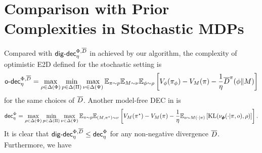 




\section{Comparison with Prior Complexities in Stochastic MDPs}\label{sec: compare DEC} 
Compared with $\mathsf{dig}\text{-}\mathsf{dec}_\eta^{\Phi, \overline{D}}$ in  achieved by our algorithm, the complexity of optimistic E2D  \citep{foster2024model} defined for the stochastic setting is
\begin{align}
    \mathsf{o}\text{-}\mathsf{dec}_\eta^{\Phi, \overline{D}} = \max_{\rho\in\Delta(\Phi)} \min_{p\in\Delta(\Pi)} \max_{\nu\in \Delta(\Psi)} \mathbb{E}_{\pi\sim p}\mathbb{E}_{M\sim \nu}\mathbb{E}_{\phi \sim \rho}\left[ V_\phi(\pi_\phi) - V_M(\pi) - \frac{1}{\eta} \overline{D}^\pi(\phi\|M)\right] \label{eq: odec high level}  
\end{align}
for the same choices of $\overline{D}$. 
Another model-free DEC in \cite{liu2025decision} is 
\begin{align*}
    \mathsf{dec}_\eta^\Phi = \max_{\rho\in\Delta(\Phi)} \min_{p\in\Delta(\Pi)} \max_{\nu\in \Delta(\Psi)}  \mathbb{E}_{\pi\sim p}\mathbb{E}_{(M,\pi^\star)\sim \nu}\left[ V_M(\pi^\star) - V_M(\pi) - \frac{1}{\eta}\mathbb{E}_{o\sim M(\cdot|\pi)}\left[\text{KL}(\nu_{\pmb{\phi}}(\cdot|\pi, o), \rho)\right] \right].   
\end{align*}
It is clear that $\mathsf{dig}\text{-}\mathsf{dec}_\eta^{\Phi,\overline{D}}\leq \mathsf{dec}_\eta^{\Phi}$ for any non-negative divergence $\overline{D}$. Furthermore, we have 

